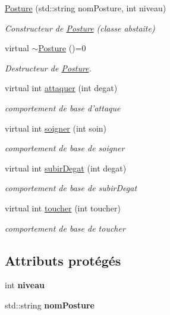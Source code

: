 \begin{DoxyCompactItemize}
\item 
\hyperlink{classPosture_a926ec001a2ff5bf2577979a9804807dd}{Posture} (std\-::string nom\-Posture, int niveau)
\begin{DoxyCompactList}\small\item\em Constructeur de \hyperlink{classPosture}{Posture} (classe abstaite) \end{DoxyCompactList}\item 
\hypertarget{classPosture_ac7e7d04c473abd081d756dac19cbc778}{virtual \hyperlink{classPosture_ac7e7d04c473abd081d756dac19cbc778}{$\sim$\-Posture} ()=0}\label{classPosture_ac7e7d04c473abd081d756dac19cbc778}

\begin{DoxyCompactList}\small\item\em Destructeur de \hyperlink{classPosture}{Posture}. \end{DoxyCompactList}\item 
virtual int \hyperlink{classPosture_ae26355a91999a62fc528a73021e76d1f}{attaquer} (int degat)
\begin{DoxyCompactList}\small\item\em comportement de base d'attaque \end{DoxyCompactList}\item 
virtual int \hyperlink{classPosture_ab47310e905a5f6de83c945920f7c38b1}{soigner} (int soin)
\begin{DoxyCompactList}\small\item\em comportement de base de soigner \end{DoxyCompactList}\item 
virtual int \hyperlink{classPosture_a6c63571b8221847cf0abb1dce0ae1c5f}{subir\-Degat} (int degat)
\begin{DoxyCompactList}\small\item\em comportement de base de subir\-Degat \end{DoxyCompactList}\item 
virtual int \hyperlink{classPosture_a0988e92a33908186f74c44b54c1cb6db}{toucher} (int toucher)
\begin{DoxyCompactList}\small\item\em comportement de base de toucher \end{DoxyCompactList}\end{DoxyCompactItemize}
\subsection*{Attributs protégés}
\begin{DoxyCompactItemize}
\item 
\hypertarget{classPosture_a2630cb88d5c05164a9511bd93d40cbc6}{int {\bfseries niveau}}\label{classPosture_a2630cb88d5c05164a9511bd93d40cbc6}

\item 
\hypertarget{classPosture_a01479226a03454494774abf7330153d7}{std\-::string {\bfseries nom\-Posture}}\label{classPosture_a01479226a03454494774abf7330153d7}

\end{DoxyCompactItemize}


